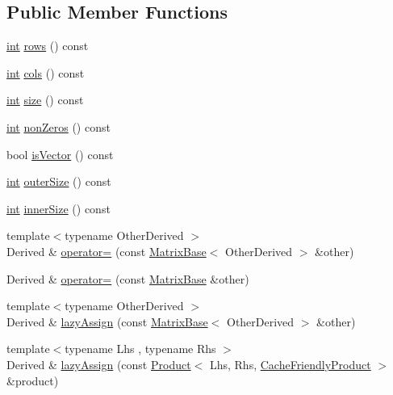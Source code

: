 \subsection*{Public Member Functions}
\begin{DoxyCompactItemize}
\item 
\hyperlink{ioapi_8h_a787fa3cf048117ba7123753c1e74fcd6}{int} \hyperlink{class_matrix_base_ae82810ba95da637cdf434b4274083723}{rows} () const 
\item 
\hyperlink{ioapi_8h_a787fa3cf048117ba7123753c1e74fcd6}{int} \hyperlink{class_matrix_base_abe5381b539f87237647bc651a1ac0364}{cols} () const 
\item 
\hyperlink{ioapi_8h_a787fa3cf048117ba7123753c1e74fcd6}{int} \hyperlink{class_matrix_base_a0a319e2fbc540dc3c52d9bc50a4ac0f6}{size} () const 
\item 
\hyperlink{ioapi_8h_a787fa3cf048117ba7123753c1e74fcd6}{int} \hyperlink{class_matrix_base_a54f7489de057fdb1f0d7006565761d39}{non\-Zeros} () const 
\item 
bool \hyperlink{class_matrix_base_adf50a950a43ae3e18a55cfaae8b9ac98}{is\-Vector} () const 
\item 
\hyperlink{ioapi_8h_a787fa3cf048117ba7123753c1e74fcd6}{int} \hyperlink{class_matrix_base_abb98339e065cae61982996ead59d2e6c}{outer\-Size} () const 
\item 
\hyperlink{ioapi_8h_a787fa3cf048117ba7123753c1e74fcd6}{int} \hyperlink{class_matrix_base_a8951507161df4239934e8f1bf5f4fa65}{inner\-Size} () const 
\item 
{\footnotesize template$<$typename Other\-Derived $>$ }\\Derived \& \hyperlink{class_matrix_base_a5f89bb442c70967639638aadd930ddf5}{operator=} (const \hyperlink{class_matrix_base}{Matrix\-Base}$<$ Other\-Derived $>$ \&other)
\item 
Derived \& \hyperlink{class_matrix_base_a8cc99de7fcc3fff4dbf673dd52c53626}{operator=} (const \hyperlink{class_matrix_base}{Matrix\-Base} \&other)
\item 
{\footnotesize template$<$typename Other\-Derived $>$ }\\Derived \& \hyperlink{class_matrix_base_a85dfa6058e1fbb85d412fd7e3469babd}{lazy\-Assign} (const \hyperlink{class_matrix_base}{Matrix\-Base}$<$ Other\-Derived $>$ \&other)
\item 
{\footnotesize template$<$typename Lhs , typename Rhs $>$ }\\Derived \& \hyperlink{class_matrix_base_a17a97d8c5c6dd449fff084b1b290656c}{lazy\-Assign} (const \hyperlink{class_product}{Product}$<$ Lhs, Rhs, \hyperlink{_constants_8h_a19539c4a85742928cd91d83569d63c06a3adaf09db92895066d5e22f9eed4e68e}{Cache\-Friendly\-Product} $>$ \&product)

\end{DoxyCompactItemize}
